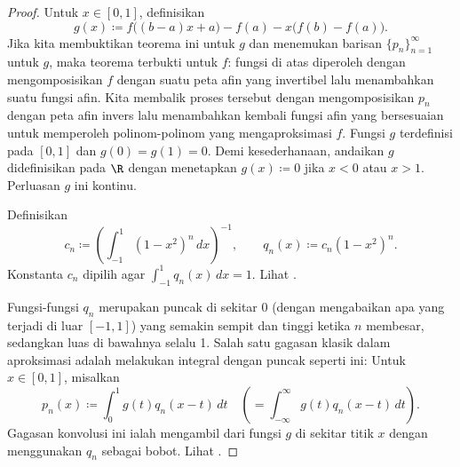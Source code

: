 \begin{proof}
Untuk $x \in [0,1]$,
definisikan
\begin{equation*}
g(x) \coloneqq f\bigl((b-a)x+a\bigr)-f(a) - x\bigl(f(b)-f(a)\bigr) .
\end{equation*}
Jika kita membuktikan teorema ini untuk $g$ dan menemukan barisan
$\{ p_n \}_{n=1}^\infty$ untuk $g$,
maka teorema terbukti untuk $f$: fungsi di atas diperoleh dengan
mengomposisikan $f$ dengan suatu peta afin yang invertibel lalu menambahkan
suatu fungsi afin.  Kita membalik proses tersebut dengan mengomposisikan $p_n$
dengan peta afin invers lalu menambahkan kembali fungsi afin yang bersesuaian
untuk memperoleh polinom-polinom yang mengaproksimasi $f$.
Fungsi $g$ terdefinisi pada $[0,1]$ dan $g(0)=g(1)=0$.
Demi kesederhanaan, andaikan
$g$ didefinisikan pada $\R$ dengan menetapkan
$g(x) \coloneqq 0$ jika $x < 0$ atau $x > 1$.  Perluasan $g$ ini kontinu.

Definisikan
\begin{equation*}
c_n \coloneqq {\left( \int_{-1}^1 {(1-x^2)}^n\,dx \right)}^{-1} ,
\qquad
q_n(x) \coloneqq c_n (1-x^2)^n .
\end{equation*}
Konstanta $c_n$ dipilih
agar $\int_{-1}^1 q_n(x)\,dx = 1$.
Lihat .

\begin{myfigureht}
\caption{Grafik fungsi-fungsi delta hampiran $q_n$ pada $[-1,1]$ untuk
$n=5,10,15,20,\ldots,100$; nilai $n$ yang lebih besar ditampilkan dalam nuansa
yang lebih terang.\label{fig:weierqn}}
\end{myfigureht}

Fungsi-fungsi $q_n$ merupakan puncak di sekitar 0 (dengan mengabaikan apa yang
terjadi di luar $[-1,1]$) yang semakin sempit dan tinggi ketika $n$ membesar,
sedangkan luas di bawahnya selalu 1.
Salah satu gagasan klasik dalam aproksimasi
adalah melakukan integral \emph{} dengan puncak seperti ini:
Untuk $x \in [0,1]$, misalkan
\begin{equation*}
p_n(x) \coloneqq \int_{0}^1 g(t)q_n(x-t) \,dt \quad \left( = \int_{-\infty}^\infty
g(t)q_n(x-t) \,dt \right) .
\end{equation*}
Gagasan konvolusi ini ialah mengambil  dari fungsi
$g$ di sekitar titik $x$ dengan menggunakan $q_n$ sebagai bobot.
Lihat .


\end{proof}
